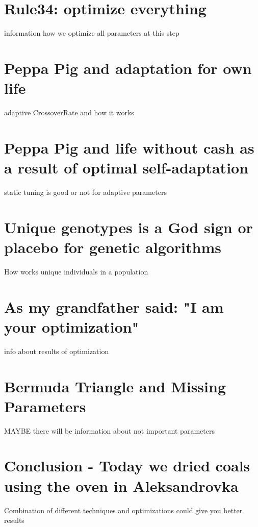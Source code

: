 \section{Rule34: optimize everything}
information how we optimize all parameters at this step

\section{Peppa Pig and adaptation for own life}
adaptive CrossoverRate and how it works

\section{Peppa Pig and life without cash as a result of optimal self-adaptation}
static tuning is good or not for adaptive parameters

\section{Unique genotypes is a God sign or placebo for genetic algorithms}
How works unique individuals in a population

\section{As my grandfather said: "I am your optimization"}
info about results of optimization

\section{Bermuda Triangle and Missing Parameters}
MAYBE there will be information about not important parameters

\section*{Conclusion - Today we dried coals using the oven in Aleksandrovka}
Combination of different techniques and optimizations could give you better results 